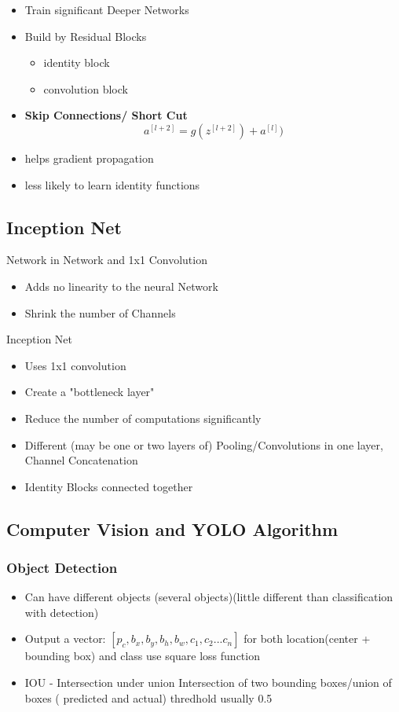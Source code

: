 \documentclass[11pt, openany]{book}              %
\begin{document}
\begin{itemize}
\item Train significant Deeper Networks
\item Build by Residual Blocks
\begin{itemize}
	\item identity block
	\item convolution block
\end{itemize}
\item \textbf{Skip Connections/ Short Cut}
$$ a^{[l+2]}= g(z^{[l+2]}) + a^{[l]})$$
\item helps gradient propagation
\item less likely to learn identity functions
\end{itemize}

\subsection{Inception Net}

Network in Network and 1x1 Convolution

\begin{itemize}
	\item Adds no linearity to the neural Network
	\item Shrink the number of Channels
\end{itemize}

Inception Net

\begin{itemize}
	\item Uses 1x1 convolution
	\item Create a "bottleneck layer"
	\item Reduce the number of computations significantly
	\item Different (may be one or two layers of) Pooling/Convolutions in one layer, Channel Concatenation
	\item Identity Blocks connected together
\end{itemize}

\subsection{Computer Vision and YOLO Algorithm}

\subsubsection{Object Detection}

\begin{itemize}
\item Can have different objects (several objects)(little different than classification with detection)
\item Output a vector: $[p_c, b_x,b_y,b_h,b_w, c_1,c_2...c_n]$ for both location(center + bounding box) and class
	\subitem use square loss function
\item IOU - Intersection under union
	\subitem Intersection of two bounding boxes/union of boxes ( predicted and actual) 
	\subitem thredhold usually 0.5
\end{itemize}
\end{document}

